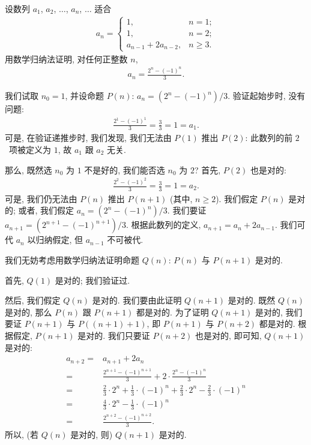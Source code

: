 \documentclass[../libro.tex]{subfiles}
\begin{document}
\begin{example}
    设数列 \(a_1\), \(a_2\), \(\dots\), \(a_n\), \(\dots\) 适合
    \begin{align*}
        a_n =
        \begin{cases}
            1,                  & n = 1;    \\
            1,                  & n = 2;    \\
            a_{n-1} + 2a_{n-2}, & n \geq 3.
        \end{cases}
    \end{align*}
    用数学归纳法证明,
    对任何正整数 \(n\),
    \begin{align*}
        a_n = \frac{2^n - (-1)^n}{3}.
    \end{align*}

    我们试取 \(n_0 = 1\),
    并设命题 \(P(n)\): \(a_n = (2^n - (-1)^n)/3\).
    验证起始步时, 没有问题:
    \begin{align*}
        \frac{2^1 - (-1)^1}{3} = \frac{3}{3} = 1 = a_1.
    \end{align*}
    可是, 在验证递推步时,
    我们发现,
    我们无法由 \(P(1)\) 推出 \(P(2)\):
    此数列的前 \(2\)~项被定义为 \(1\),
    故 \(a_1\) 跟 \(a_2\) 无关.

    那么, 既然选 \(n_0\) 为 \(1\) 不是好的,
    我们能否选 \(n_0\) 为 \(2\)?
    首先, \(P(2)\) 也是对的:
    \begin{align*}
        \frac{2^2 - (-1)^2}{3} = \frac{3}{3} = 1 = a_2.
    \end{align*}
    可是,
    我们仍无法由 \(P(n)\) 推出 \(P(n+1)\)
    (其中, \(n \geq 2\)).
    我们假定 \(P(n)\) 是对的;
    或者, 我们假定 \(a_n = (2^n - (-1)^n)/3\).
    我们要证 \(a_{n+1} = (2^{n+1} - (-1)^{n+1})/3\).
    根据此数列的定义,
    \(a_{n+1} = a_n + 2a_{n-1}\).
    我们可代 \(a_n\) 以归纳假定,
    但 \(a_{n-1}\) 不可被代.

    我们无妨考虑用数学归纳法证明命题
    \(Q(n)\):
    \(P(n)\) 与 \(P(n+1)\) 是对的.

    首先, \(Q(1)\) 是对的; 我们验证过.

    然后, 我们假定 \(Q(n)\) 是对的.
    我们要由此证明 \(Q(n+1)\) 是对的.
    既然 \(Q(n)\) 是对的, 那么 \(P(n)\) 跟 \(P(n+1)\) 都是对的.
    为了证明 \(Q(n+1)\) 是对的, 我们要证
    \(P(n+1)\) 与 \(P((n+1)+1)\),
    即 \(P(n+1)\) 与 \(P(n+2)\) 都是对的.
    根据假定, \(P(n+1)\) 是对的.
    我们只要证 \(P(n+2)\) 也是对的,
    即可知, \(Q(n+1)\) 是对的:
    \begin{align*}
        a_{n+2}
        = {} & a_{n+1} + 2a_n
        \\
        = {} & \frac{2^{n+1} - (-1)^{n+1}}{3}
        + 2 \cdot \frac{2^n - (-1)^n}{3}
        \\
        = {} & \frac{2}{3} \cdot 2^n + \frac{1}{3} \cdot (-1)^n
        + \frac{2}{3} \cdot 2^n - \frac{2}{3} \cdot (-1)^n
        \\
        = {} & \frac{4}{3} \cdot 2^n - \frac{1}{3} \cdot (-1)^n
        \\
        = {} & \frac{2^{n+2} - (-1)^{n+2}}{3}.
    \end{align*}
    所以, (若 \(Q(n)\) 是对的, 则) \(Q(n+1)\) 是对的.


\end{example}
\end{document}
